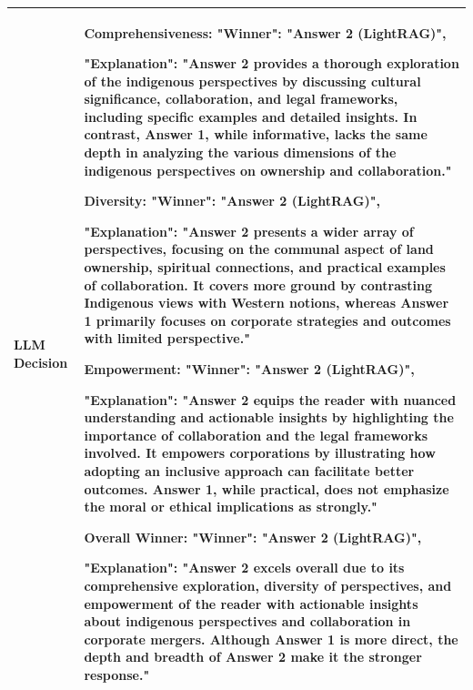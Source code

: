 \documentclass{article} %
\begin{document}
\begin{table}[t]
{\begin{tabular}{|l|p{15cm}|}
 \\ \hline
\textbf{LLM Decision} & \textbf{Comprehensiveness}:  
"Winner": "Answer 2 (LightRAG)", %

"Explanation": "Answer 2 provides a thorough exploration of the indigenous perspectives by discussing cultural significance, collaboration, and legal frameworks, including specific examples and detailed insights. In contrast, Answer 1, while informative, lacks the same depth in analyzing the various dimensions of the indigenous perspectives on ownership and collaboration." \newline

\textbf{Diversity}:  
"Winner": "Answer 2 (LightRAG)", %

"Explanation": "Answer 2 presents a wider array of perspectives, focusing on the communal aspect of land ownership, spiritual connections, and practical examples of collaboration. It covers more ground by contrasting Indigenous views with Western notions, whereas Answer 1 primarily focuses on corporate strategies and outcomes with limited perspective." \newline

\textbf{Empowerment}:  
"Winner": "Answer 2 (LightRAG)", %

"Explanation": "Answer 2 equips the reader with nuanced understanding and actionable insights by highlighting the importance of collaboration and the legal frameworks involved. It empowers corporations by illustrating how adopting an inclusive approach can facilitate better outcomes. Answer 1, while practical, does not emphasize the moral or ethical implications as strongly." \newline

\textbf{Overall Winner}:  
"Winner": "Answer 2 (LightRAG)",  %

"Explanation": "Answer 2 excels overall due to its comprehensive exploration, diversity of perspectives, and empowerment of the reader with actionable insights about indigenous perspectives and collaboration in corporate mergers. Although Answer 1 is more direct, the depth and breadth of Answer 2 make it the stronger response." \\ \hline

\end{tabular}
}
\end{table}
\end{document}
